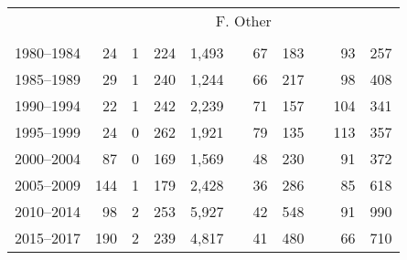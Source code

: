 \documentclass{article}
\begin{document}
\begin{table}[h]
{\begin{tabular}{rrrrrrrrrrr}
            \cline{2-11}
            \\[-2.5ex]
            & \multicolumn{10}{c}{F. Other} \\ \cline{2-11}
            \\[-2.5ex]
            1980–1984 & 24 & 1 & 224 & 1,493 & & 67 & 183 & & 93 & 257 \\
            1985–1989 & 29 & 1 & 240 & 1,244 & & 66 & 217 & & 98 & 408 \\
            1990–1994 & 22 & 1 & 242 & 2,239 & & 71 & 157 & & 104 & 341 \\
            1995–1999 & 24 & 0 & 262 & 1,921 & & 79 & 135 & & 113 & 357 \\
            2000–2004 & 87 & 0 & 169 & 1,569 & & 48 & 230 & & 91 & 372 \\
            2005–2009 & 144 & 1 & 179 & 2,428 & & 36 & 286 & & 85 & 618 \\
            2010–2014 & 98 & 2 & 253 & 5,927 & & 42 & 548 & & 91 & 990 \\
            2015–2017 & 190 & 2 & 239 & 4,817 & & 41 & 480 & & 66 & 710 \\
    
        \hline
        \end{tabular}%
        }
    \end{table}
\end{document}
